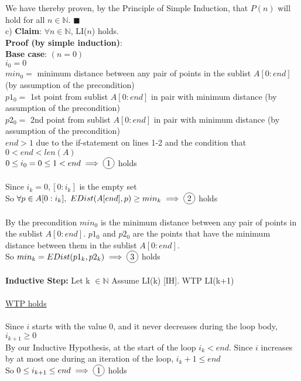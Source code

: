 \documentclass{article}
\newcommand{\N}{\mathbb{N}}
\DeclareRobustCommand*\circled[1]{\tikz[baseline =(char.base)]{\node[shape=circle, draw, inner sep = 2pt] (char) {#1};}}
\begin{document}
\begin{enumerate}
	We have thereby proven, by the Principle of Simple Induction, that $P(n)$ will hold for all $n \in \N$. \null\hfill $\blacksquare$ \\
	
	c) \textbf{Claim}: $\forall n \in \N$, LI($n$) holds. \\
	
	\textbf{Proof (by simple induction)}: \\
	
	\textbf{Base case}: $(n = 0)$ \\
	$i_0 = 0$ \\
	$min_0 =$ minimum distance between any pair of points in the sublist $A[0: end]$ (by assumption of the precondition) \\
	$p1_0 =$ 1st point from sublist $A[0:end]$ in pair with minimum distance (by assumption of the precondition) \\
	$p2_0 =$ 2nd point from sublist $A[0: end]$ in pair with minimum distance (by assumption of the precondition) \\
	$end > 1$ due to the if-statement on lines 1-2 and the condition that $0 < end < len(A)$ \\
	
	$0 \leq i_0 = 0\leq 1 < end \implies \circled{1}$ holds \\\\
	Since $i_k = 0, [0:i_k]$ is the empty set\\
	So $\forall p \in A[0:i_k],\ EDist(A[end],p) \geq min_k \implies \circled{2}$ holds\\\\
	By the precondition $min_0$ is the minimum distance between any pair of points in the sublist $A[0:end]$. 
	$p1_0$ and $p2_0$ are the points that have the minimum distance between them in the sublist $A[0:end]$.\\
	So $min_k = EDist(p1_k, p2_k) \implies \circled{3}$ holds\\\\
	
	\textbf{Inductive Step:} Let k $\in \N$ Assume LI(k) [IH]. WTP LI(k+1)\\\\
	
	\underline{WTP \circled{1} holds}\\\\
	Since $i$ starts with the value 0, and it never decreases during the loop body, $i_{k+1} \geq 0$\\
	By our Inductive Hypothesis, at the start of the loop $i_k< end$. Since $i$ increases by at most one during an iteration of the loop, $i_k+1 \leq end$\\
	So $0\leq i_{k+1} \leq end \implies \circled{1}$ holds\\\\
	

\end{enumerate}
\end{document}
